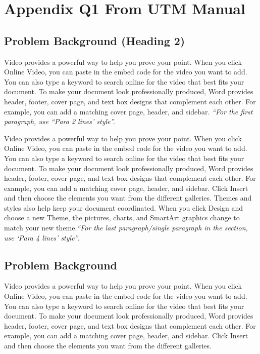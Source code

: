 \documentclass[oneside]{utmthesis}
\begin{document}
\tableofcontents
\listoftables
\listoffigures


\listofabbre
{}


\listofsymbols
{}


\listofappendices


\mainmatter

\chapter{Appendix Q1 From UTM Manual}

\section{Problem Background (Heading 2) }
Video provides a powerful way to help you prove your point. When you click 
Online Video, you can paste in the embed code for the video you want to add. You can 
also type a keyword to search online for the video that best fits your document. To 
make your document look professionally produced, Word provides header, footer, 
cover page, and text box designs that complement each other. For example, you can 
add a matching cover page, header, and sidebar. \emph{``For the first paragraph, use ``Para 
2 lines' style''.} 

Video provides a powerful way to help you prove your point. When you click 
Online Video, you can paste in the embed code for the video you want to add. You can 
also type a keyword to search online for the video that best fits your document. To 
make your document look professionally produced, Word provides header, footer, 
cover page, and text box designs that complement each other. For example, you can 
add a matching cover page, header, and sidebar. Click Insert and then choose the 
elements you want from the different galleries. Themes and styles also help keep your 
document coordinated. When you click Design and choose a new Theme, the pictures, 
charts, and SmartArt graphics change to match your new theme.\emph{``For the last 
paragraph/single paragraph in the section, use `Para 4 lines' style''.} 

\section{Problem Background}
Video provides a powerful way to help you prove your point. When you click 
Online Video, you can paste in the embed code for the video you want to add. You can 
also type a keyword to search online for the video that best fits your document. To 
make your document look professionally produced, Word provides header, footer, 
cover page, and text box designs that complement each other. For example, you can 
add a matching cover page, header, and sidebar. Click Insert and then choose the 
elements you want from the different galleries.  
\end{document}
